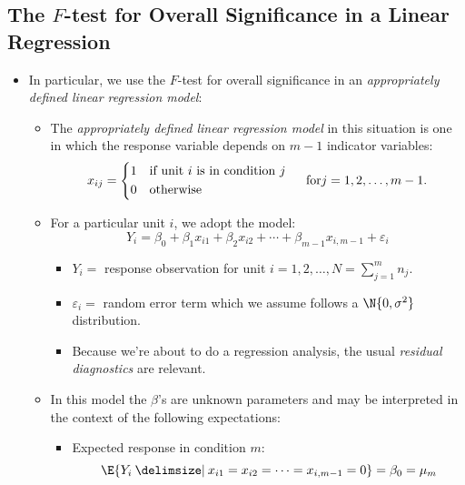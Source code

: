 \subsection{The \texorpdfstring{$ F $}{F}-test for Overall Significance in a Linear Regression}
\begin{itemize}
      \item In particular, we use the $ F $-test for overall significance in an
            \emph{appropriately defined linear regression model}:
            \begin{itemize}
                  \item The \emph{appropriately defined linear regression model}
                        in this situation is one in which the response
                        variable depends on $ m-1 $ indicator variables:
                        \[ x_{ij}=\begin{cases*}
                                    1 & if unit $ i $ is in condition $ j $ \\
                                    0 & otherwise
                              \end{cases*}\quad\text{for}j=1,2,\ldots,m-1. \]
                  \item For a particular unit $ i $, we adopt the model:
                        \[ Y_{i}=\beta_0+\beta_1x_{i1}+\beta_2x_{i2}+\cdots+\beta_{m-1}x_{i,m-1}+\varepsilon_i \]
                        \begin{itemize}
                              \item $ Y_i = $ response observation for unit $ i=1,2,\ldots,N=\sum_{j=1}^{m} n_j $.
                              \item $ \varepsilon_i = $ random error term which we assume follows a $ \N{0,\sigma^2} $ distribution.
                              \item Because we're about to do a regression analysis, the usual \emph{residual diagnostics} are relevant.
                        \end{itemize}
                  \item In this model the $ \beta $'s are unknown parameters
                        and may be interpreted in the context of the
                        following expectations:
                        \begin{itemize}
                              \item Expected response in condition $ m $:
                                    \[ \E{Y_i\given x_{i1}=x_{i2}=\cdots=x_{i,m-1}=0}=\beta_0=\mu_m \]

\end{itemize}
\end{itemize}
\end{itemize}
